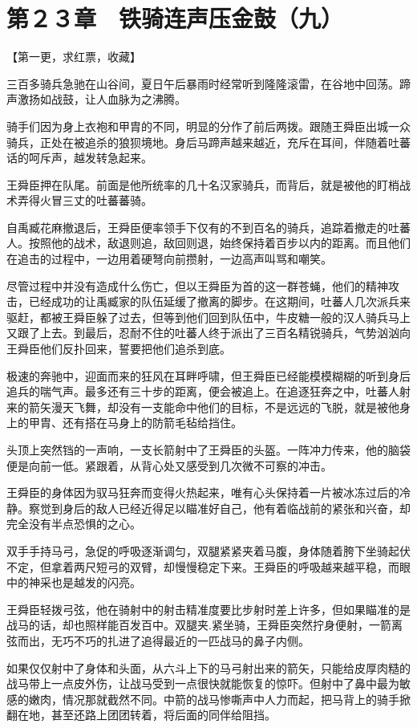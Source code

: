 \section{第２３章　铁骑连声压金鼓（九）}

【第一更，求红票，收藏】

三百多骑兵急驰在山谷间，夏日午后暴雨时经常听到隆隆滚雷，在谷地中回荡。蹄声激扬如战鼓，让人血脉为之沸腾。

骑手们因为身上衣袍和甲胄的不同，明显的分作了前后两拨。跟随王舜臣出城一众骑兵，正处在被追杀的狼狈境地。身后马蹄声越来越近，充斥在耳间，伴随着吐蕃话的呵斥声，越发转急起来。

王舜臣押在队尾。前面是他所统率的几十名汉家骑兵，而背后，就是被他的盯梢战术弄得火冒三丈的吐蕃蕃骑。

自禹臧花麻撤退后，王舜臣便率领手下仅有的不到百名的骑兵，追踪着撤走的吐蕃人。按照他的战术，敌退则追，敌回则退，始终保持着百步以内的距离。而且他们在追击的过程中，一边用着硬弩向前攒射，一边高声叫骂和嘲笑。

尽管过程中并没有造成什么伤亡，但以王舜臣为首的这一群苍蝇，他们的精神攻击，已经成功的让禹臧家的队伍延缓了撤离的脚步。在这期间，吐蕃人几次派兵来驱赶，都被王舜臣躲了过去，但等到他们回到队伍中，牛皮糖一般的汉人骑兵马上又跟了上去。到最后，忍耐不住的吐蕃人终于派出了三百名精锐骑兵，气势汹汹向王舜臣他们反扑回来，誓要把他们追杀到底。

极速的奔驰中，迎面而来的狂风在耳畔呼啸，但王舜臣已经能模模糊糊的听到身后追兵的喘气声。最多还有三十步的距离，便会被追上。在追逐狂奔之中，吐蕃人射来的箭矢漫天飞舞，却没有一支能命中他们的目标，不是远远的飞脱，就是被他身上的甲胄、还有搭在马身上的防箭毛毡给挡住。

头顶上突然铛的一声响，一支长箭射中了王舜臣的头盔。一阵冲力传来，他的脑袋便是向前一低。紧跟着，从背心处又感受到几次微不可察的冲击。

王舜臣的身体因为驭马狂奔而变得火热起来，唯有心头保持着一片被冰冻过后的冷静。察觉到身后的敌人已经近得足以瞄准好自己，他有着临战前的紧张和兴奋，却完全没有半点恐惧的之心。

双手手持马弓，急促的呼吸逐渐调匀，双腿紧紧夹着马腹，身体随着胯下坐骑起伏不定，但拿着两尺短弓的双臂，却慢慢稳定下来。王舜臣的呼吸越来越平稳，而眼中的神采也是越发的闪亮。

王舜臣轻拨弓弦，他在骑射中的射击精准度要比步射时差上许多，但如果瞄准的是战马的话，却也照样能百发百中。双腿夹.紧坐骑，王舜臣突然拧身便射，一箭离弦而出，无巧不巧的扎进了追得最近的一匹战马的鼻子内侧。

如果仅仅射中了身体和头面，从六斗上下的马弓射出来的箭矢，只能给皮厚肉糙的战马带上一点皮外伤，让战马受到一点很快就能恢复的惊吓。但射中了鼻中最为敏感的嫩肉，情况那就截然不同。中箭的战马惨嘶声中人力而起，把马背上的骑手掀翻在地，甚至还路上团团转着，将后面的同伴给阻挡。

